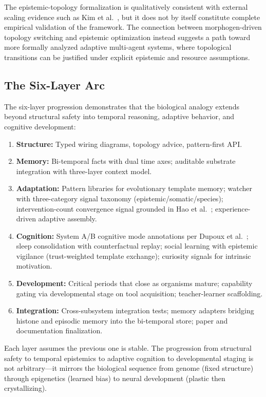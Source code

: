 The epistemic-topology formalization is qualitatively consistent with external scaling evidence such as
Kim et al.~\cite{kim2025scaling}, but it does not by itself constitute complete empirical validation of the
framework. The connection between morphogen-driven topology switching and epistemic optimization instead
suggests a path toward more formally analyzed adaptive multi-agent systems, where topological transitions
can be justified under explicit epistemic and resource assumptions.

\subsection*{The Six-Layer Arc}

The six-layer progression demonstrates that the biological analogy extends beyond structural safety into temporal reasoning, adaptive behavior, and cognitive development:

\begin{enumerate}[leftmargin=*]
\item \textbf{Structure:} Typed wiring diagrams, topology advice, pattern-first API.
\item \textbf{Memory:} Bi-temporal facts with dual time axes; auditable substrate integration with three-layer context model.
\item \textbf{Adaptation:} Pattern libraries for evolutionary template memory; watcher with three-category signal taxonomy (epistemic/somatic/species); intervention-count convergence signal grounded in Hao et al.~\cite{hao2026bigmas}; experience-driven adaptive assembly.
\item \textbf{Cognition:} System A/B cognitive mode annotations per Dupoux et al.~\cite{dupoux2026learning}; sleep consolidation with counterfactual replay; social learning with epistemic vigilance (trust-weighted template exchange); curiosity signals for intrinsic motivation.
\item \textbf{Development:} Critical periods that close as organisms mature; capability gating via developmental stage on tool acquisition; teacher-learner scaffolding.
\item \textbf{Integration:} Cross-subsystem integration tests; memory adapters bridging histone and episodic memory into the bi-temporal store; paper and documentation finalization.
\end{enumerate}

Each layer assumes the previous one is stable. The progression from structural safety to temporal epistemics to adaptive cognition to developmental staging is not arbitrary---it mirrors the biological sequence from genome (fixed structure) through epigenetics (learned bias) to neural development (plastic then crystallizing).

